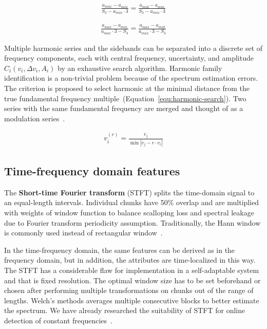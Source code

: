 \begin{ceqn}\begin{align}
\frac{a_{max} - a_{min}}{S_3 - a_{min} \cdot 3} = \frac{a_{mid} - a_{min}}{S_3 - a_{min} \cdot 3}
\label{equ:mms-maxima}
\end{align}\end{ceqn}

\begin{ceqn}\begin{align}
\frac{a_{max} - a_{min}}{a_{max} \cdot 3 - S_3} = \frac{a_{max} - a_{mid}}{a_{max} \cdot 3 - S_3}
\label{equ:mms-minima}
 \end{align}\end{ceqn}

Multiple harmonic series and the sidebands can be separated into a discrete set of frequency components, each with central frequency, uncertainty, and amplitude $C_i(v_i, \Delta v_i, A_i)$ by an exhaustive search algorithm. Harmonic family identification is a non-trivial problem because of the spectrum estimation errors. The criterion is proposed to select harmonic at the minimal distance from the true fundamental frequency multiple~(Equation~\ref{equ:harmonic-search}). Two series with the same fundamental frequency are merged and thought of as a modulation series~\cite{gerber_identification_2013}.

\begin{ceqn}\begin{align}
v_i^{(r)} = \frac{v_j}{\min{|v_j - r \cdot v_i|}}
\label{equ:harmonic-search}
\end{align}\end{ceqn}

\subsection{Time-frequency domain features}
The \textbf{Short-time Fourier transform} (STFT) splits the time-domain signal to an equal-length intervals. Individual chunks have 50\% overlap and are multiplied with weights of window function to balance scalloping loss and spectral leakage due to Fourier transform periodicity assumption. Traditionally, the Hann window is commonly used instead of rectangular window~\cite{ziaran_technicka_2013,noauthor_iso_2016_2}.

In the time-frequency domain, the same features can be derived as in the frequency domain, but in addition, the attributes are time-localized in this way. The STFT has a considerable flaw for implementation in a self-adaptable system and that is fixed resolution. The optimal window size has to be set beforehand or chosen after performing multiple transformations on chunks out of the range of lengths. Welch's methods averages multiple consecutive blocks to better estimate the spectrum. We have already researched the suitability of STFT for online detection of constant frequencies~\cite{hajek_iot_2022}.

